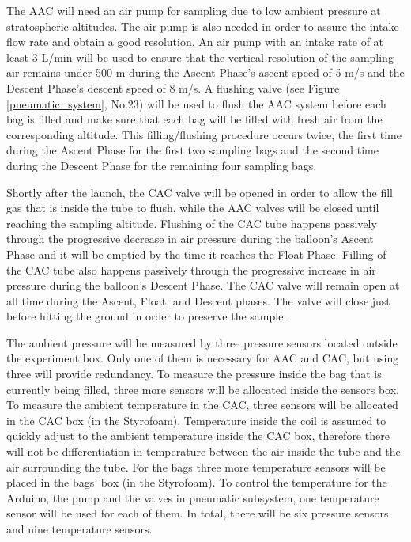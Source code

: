 


The AAC will need an air pump for sampling due to low ambient pressure at stratospheric altitudes. The air pump is also needed in order to assure the intake flow rate and obtain a good resolution. An air pump with an intake rate of at least 3 L/min will be used to ensure that the vertical resolution of the sampling air remains under 500 m during the Ascent Phase's ascent speed of 5 m/s and the  Descent Phase's descent speed of 8 m/s. A flushing valve (see Figure \ref{pneumatic_system}, No.23) will be used to flush the AAC system before each bag is filled and make sure that each bag will be filled with fresh air from the corresponding altitude. This filling/flushing procedure occurs twice, the first time during the Ascent Phase for the first two sampling bags and the second time during the Descent Phase for the remaining four sampling bags.

Shortly after the launch, the CAC valve will be opened in order to allow the fill gas that is inside the tube to flush, while the AAC valves will be closed until reaching the sampling altitude. Flushing of the CAC tube happens passively through the progressive decrease in air pressure during the balloon's Ascent Phase and it will be emptied by the time it reaches the Float Phase. Filling of the CAC tube also happens passively through the progressive increase in air pressure during the balloon's Descent Phase. The CAC valve will remain open at all time during the Ascent, Float, and Descent phases. The valve will close just before hitting the ground in order to preserve the sample. 

The ambient pressure will be measured by three pressure sensors located outside the experiment box. Only one of them is necessary for AAC and CAC, but using three will provide redundancy. To measure the pressure inside the bag that is currently being filled, three more sensors will be allocated inside the sensors box. To measure the ambient temperature in the CAC, three sensors will be allocated in the CAC box (in the Styrofoam). Temperature inside the coil is assumed to quickly adjust to the ambient temperature inside the CAC box, therefore there will not be differentiation in temperature between the air inside the tube and the air surrounding the tube. For the bags three more temperature sensors will be placed in the bags' box (in the Styrofoam). To control the temperature for the Arduino, the pump and the valves in pneumatic subsystem, one temperature sensor will be used for each of them. In total, there will be six pressure sensors and nine temperature sensors. 

